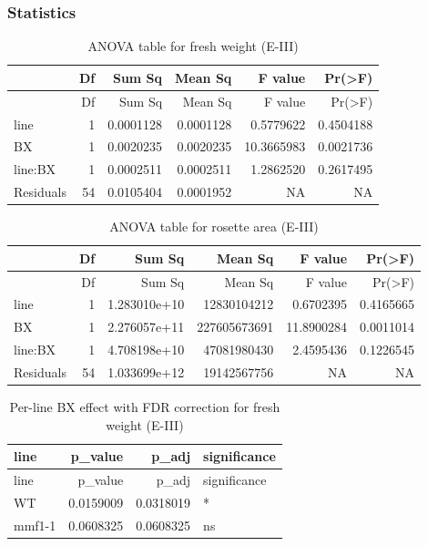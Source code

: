 \documentclass[
  10pt,
]{article}
\begin{document}
\subsubsection{Statistics}\label{statistics}

\begin{longtable}[]{@{}lrrrrr@{}}
\caption{ANOVA table for fresh weight (E-III)}\tabularnewline
\toprule\noalign{}
& Df & Sum Sq & Mean Sq & F value & Pr(\textgreater F) \\
\midrule\noalign{}
\endfirsthead
\toprule\noalign{}
& Df & Sum Sq & Mean Sq & F value & Pr(\textgreater F) \\
\midrule\noalign{}
\endhead
\bottomrule\noalign{}
\endlastfoot
line & 1 & 0.0001128 & 0.0001128 & 0.5779622 & 0.4504188 \\
BX & 1 & 0.0020235 & 0.0020235 & 10.3665983 & 0.0021736 \\
line:BX & 1 & 0.0002511 & 0.0002511 & 1.2862520 & 0.2617495 \\
Residuals & 54 & 0.0105404 & 0.0001952 & NA & NA \\
\end{longtable}

\begin{longtable}[]{@{}lrrrrr@{}}
\caption{ANOVA table for rosette area (E-III)}\tabularnewline
\toprule\noalign{}
& Df & Sum Sq & Mean Sq & F value & Pr(\textgreater F) \\
\midrule\noalign{}
\endfirsthead
\toprule\noalign{}
& Df & Sum Sq & Mean Sq & F value & Pr(\textgreater F) \\
\midrule\noalign{}
\endhead
\bottomrule\noalign{}
\endlastfoot
line & 1 & 1.283010e+10 & 12830104212 & 0.6702395 & 0.4165665 \\
BX & 1 & 2.276057e+11 & 227605673691 & 11.8900284 & 0.0011014 \\
line:BX & 1 & 4.708198e+10 & 47081980430 & 2.4595436 & 0.1226545 \\
Residuals & 54 & 1.033699e+12 & 19142567756 & NA & NA \\
\end{longtable}

\begin{longtable}[]{@{}lrrl@{}}
\caption{Per-line BX effect with FDR correction for fresh weight
(E-III)}\tabularnewline
\toprule\noalign{}
line & p\_value & p\_adj & significance \\
\midrule\noalign{}
\endfirsthead
\toprule\noalign{}
line & p\_value & p\_adj & significance \\
\midrule\noalign{}
\endhead
\bottomrule\noalign{}
\endlastfoot
WT & 0.0159009 & 0.0318019 & * \\
mmf1-1 & 0.0608325 & 0.0608325 & ns \\
\end{longtable}
\end{document}
